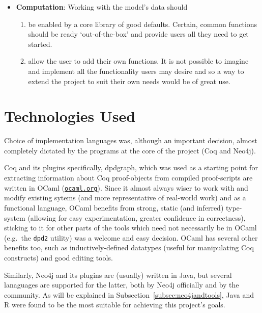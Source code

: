 \begin{itemize}
\begin{enumerate}[label=\textbf{I\arabic*},ref={I\arabic*}]
  \end{enumerate}

  \item \textbf {Computation}: Working with the model's data should
  \begin{enumerate}[label=\textbf{C\arabic*},ref={C\arabic*}]

    \item\label{req:c1} be enabled by a core library of good defaults. Certain,
      common functions should be ready `out-of-the-box' and provide users all
      they need to get started.

    \item\label{req:c2} allow the user to add their own functions. It is not
      possible to imagine and implement all the functionality users may desire
      and so a way to extend the project to suit their own needs would be of
      great use.

  \end{enumerate}


\end{itemize}

\section{Technologies Used}

Choice of implementation languages was, although an important decision, almost
completely dictated by the programs at the core of the project (Coq and Neo4j).

Coq and its plugins \textemdash specifically, dpdgraph, which was used as a
starting point for extracting information about Coq proof-objects from compiled
proof-scripts \textemdash are written in OCaml
(\href{http://ocaml.org}{\texttt{ocaml.org}}).  Since it almost always wiser to
work with and modify existing sytems (and more representative of real-world
work) and as a functional language, OCaml benefits from strong, static (and
inferred) type-system (allowing for easy experimentation, greater confidence in
correctness), sticking to it for other parts of the tools which need not
necessarily be in OCaml (e.g.\ the \texttt{dpd2} utility) was a welcome and
easy decision. OCaml has several other benefits too, such as
inductively-defined datatypes (useful for manipulating Coq constructs) and good
editing tools.

Similarly, Neo4j and its plugins are (usually) written in Java, but several
lanaguages are supported for the latter, both by Neo4j officially and by the
community. As will be explained in Subsection~\ref{subsec:neo4jandtools}, Java
and R were found to be the most suitable for achieving this project's goals.

